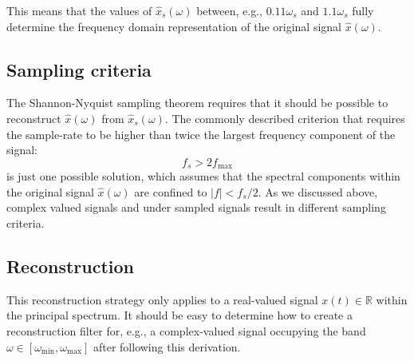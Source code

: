 This means that the values of $\hat{x}_s(\omega)$ between, e.g., $0.11\omega_s$ and $1.1\omega_s$ fully determine the frequency domain representation of the original signal $\hat{x}(\omega)$.

\subsection{Sampling criteria}
The Shannon-Nyquist sampling theorem requires that it should be possible to reconstruct $\hat{x}(\omega)$ from
$\hat{x}_s(\omega)$. The commonly described criterion that requires the sample-rate to be higher than twice the largest frequency component of the signal:
\begin{equation}
f_s > 2 f_\mathrm{max} 
\end{equation}
is just one possible solution, which assumes that the spectral components within the original signal $\hat{x}(\omega)$ are confined to $|f| < f_s/2$. As we discussed above, complex valued signals and under sampled signals result in different sampling criteria.

\subsection{Reconstruction}
This reconstruction strategy only applies to a real-valued signal $x(t) \in \mathbb{R}$ within the principal spectrum. 
It should be easy to determine how to create a reconstruction filter for, e.g., a complex-valued signal occupying the band $\omega \in
[\omega_{\mathrm{min}},\omega_{\mathrm{max}}]$ after following this derivation.

